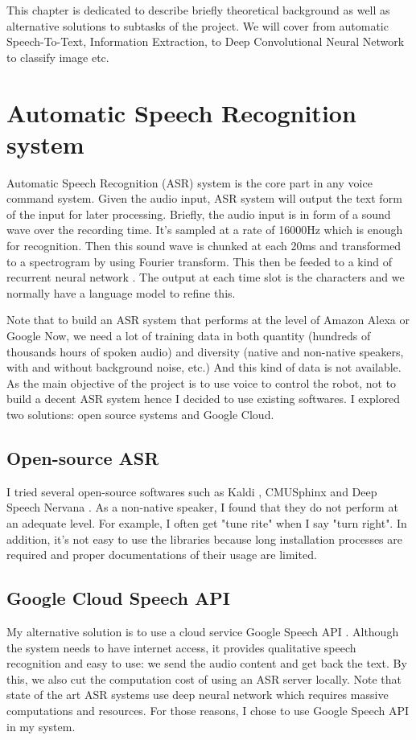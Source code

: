 This chapter is dedicated to describe briefly theoretical background as well as alternative solutions to subtasks of the project. We will cover from automatic Speech-To-Text, Information Extraction, to Deep Convolutional Neural Network to classify image etc.

\section{Automatic Speech Recognition system}
Automatic Speech Recognition (ASR) system is the core part in any voice command system. Given the audio input, ASR system will output the text form of the input for later processing. Briefly, the audio input is in form of a sound wave over the recording time. It's sampled at a rate of 16000Hz which is enough for recognition. Then this sound wave is chunked at each 20ms and transformed to a spectrogram by using Fourier transform. This then be feeded to a kind of recurrent neural network \cite{Medium:2016}. The output at each time slot is the characters and we normally have a language model to refine this. 

Note that to build an ASR system that performs at the level of Amazon Alexa or Google Now, we need a lot of training data in both quantity (hundreds of thousands hours of spoken audio) and diversity (native and non-native speakers, with and without background noise, etc.) And this kind of data is not available. As the main objective of the project is to use voice to control the robot, not to build a decent ASR system hence I decided to use existing softwares. I explored two solutions: open source systems and Google Cloud.

\subsection{Open-source ASR}
I tried several open-source softwares such as Kaldi \cite{Kaldi:2017}, CMUSphinx \cite{CMUSphinx:2017} and Deep Speech Nervana \cite{DeepSpeech:2017}. As a non-native speaker, I found that they do not perform at an adequate level. For example, I often get "tune rite" when I say "turn right". In addition, it's not easy to use the libraries because long installation processes are required and proper documentations of their usage are limited.

\subsection{Google Cloud Speech API}
My alternative solution is to use a cloud service Google Speech API \cite{GoogleCloud:2017}. Although the system needs to have internet access, it provides qualitative speech recognition and easy to use: we send the audio content and get back the text. By this, we also cut the computation cost of using an ASR server locally. Note that state of the art ASR systems use deep neural network which requires massive computations and resources. For those reasons, I chose to use Google Speech API in my system.

